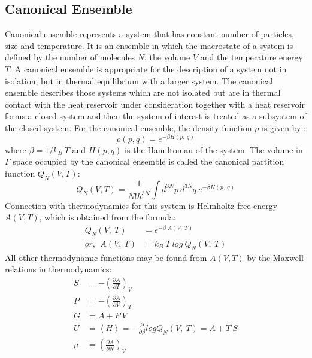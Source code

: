 \subsection{Canonical Ensemble} 
Canonical ensemble represents a system that has constant number of particles, size and temperature. It is an ensemble in which  the macrostate of a system is defined by the number of molecules $N$, the volume $V$ and the temperature energy $T$. A canonical  ensemble is appropriate for the description of a system not in isolation, but in thermal equilibrium with a larger system.  The  canonical ensemble describes those systems which are not isolated but are in thermal contact with the heat reservoir under consideration together with a heat reservoir forms a closed system and then the system of interest is treated as a subsystem of the closed system. For the canonical ensemble,  the density function $\rho $  is given by \citep{huang2009}: 
\begin{equation}
\rho (p, q) = e^{-\beta H(p,~ q)} 
\end{equation} 
where $\beta = 1/k_B~T$ and $H(p, q)$ is the Hamiltonian of the system. The volume in $\Gamma$ space occupied by the canonical ensemble is called the canonical partition function $Q_N(V, T)$:
\begin{equation}
Q_N(V, T) = \frac {1}{N! h^{3N}}\int d^{3N}p~ d^{3N}q ~ e^{-\beta H(p,~ q)}  
\end{equation} 
Connection with thermodynamics for this system is Helmholtz free energy $A (V, T)$, which is obtained from the formula: 
\begin{align}
Q_N(V,~T) & = e^{-\beta~A(V,~T)}\nonumber\\
or, ~~ A(V,~T) &= k_B~T~log~Q_N(V,~T)
\end{align}
All other thermodynamic functions may be found from $A(V, T)$ by the Maxwell relations in thermodynamics:
\begin{align}
   S & = -\left(  \frac{ \partial A} {\partial T }\right)_V  \nonumber \\
   P  &  = - \left(  \frac{ \partial A} {\partial V }\right)_T \nonumber \\
   G & = A + P~ V \\
   U &= \left\langle  H \right\rangle  = - \frac{\partial} {\partial \beta } log Q_N(V,~T) = A + T~S \nonumber \\
   \mu & = \left(  \frac{ \partial A} {\partial N }\right)_V \nonumber
 \end{align}
